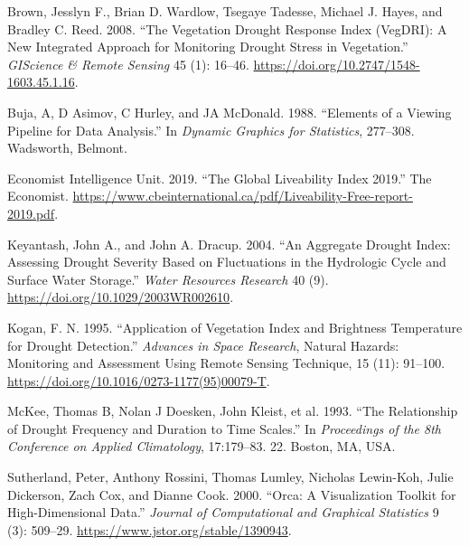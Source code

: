 \documentclass[
  letterpaper,
  DIV=11,
  numbers=noendperiod]{scrartcl}
\newlength{\cslhangindent}
\newlength{\cslentryspacingunit} %
\newenvironment{CSLReferences}[2] %
 {%
  \setlength{\parindent}{0pt}
  \ifodd #1
  \let\oldpar\par
  \def\par{\hangindent=\cslhangindent\oldpar}
  \fi
  \setlength{\parskip}{#2\cslentryspacingunit}
 }%
 {}
\begin{document}
\hypertarget{refs}{}
\begin{CSLReferences}{1}{0}
\leavevmode{}%
Brown, Jesslyn F., Brian D. Wardlow, Tsegaye Tadesse, Michael J. Hayes,
and Bradley C. Reed. 2008. {``The {Vegetation} {Drought} {Response}
{Index} ({VegDRI}): {A} {New} {Integrated} {Approach} for {Monitoring}
{Drought} {Stress} in {Vegetation}.''} \emph{GIScience \& Remote
Sensing} 45 (1): 16--46.
\url{https://doi.org/10.2747/1548-1603.45.1.16}.

\leavevmode{}%
Buja, A, D Asimov, C Hurley, and JA McDonald. 1988. {``Elements of a
Viewing Pipeline for Data Analysis.''} In \emph{Dynamic Graphics for
Statistics}, 277--308. Wadsworth, Belmont.

\leavevmode{}%
Economist Intelligence Unit. 2019. {``The Global Liveability Index
2019.''} The Economist.
\url{https://www.cbeinternational.ca/pdf/Liveability-Free-report-2019.pdf}.

\leavevmode{}%
Keyantash, John A., and John A. Dracup. 2004. {``An Aggregate Drought
Index: {Assessing} Drought Severity Based on Fluctuations in the
Hydrologic Cycle and Surface Water Storage.''} \emph{Water Resources
Research} 40 (9). \url{https://doi.org/10.1029/2003WR002610}.

\leavevmode{}%
Kogan, F. N. 1995. {``Application of Vegetation Index and Brightness
Temperature for Drought Detection.''} \emph{Advances in Space Research},
Natural {Hazards}: {Monitoring} and {Assessment} {Using} {Remote}
{Sensing} {Technique}, 15 (11): 91--100.
\url{https://doi.org/10.1016/0273-1177(95)00079-T}.

\leavevmode{}%
McKee, Thomas B, Nolan J Doesken, John Kleist, et al. 1993. {``The
Relationship of Drought Frequency and Duration to Time Scales.''} In
\emph{Proceedings of the 8th Conference on Applied Climatology},
17:179--83. 22. Boston, MA, USA.

\leavevmode{}%
Sutherland, Peter, Anthony Rossini, Thomas Lumley, Nicholas Lewin-Koh,
Julie Dickerson, Zach Cox, and Dianne Cook. 2000. {``Orca: {A}
{Visualization} {Toolkit} for {High}-{Dimensional} {Data}.''}
\emph{Journal of Computational and Graphical Statistics} 9 (3): 509--29.
\url{https://www.jstor.org/stable/1390943}.


\end{CSLReferences}
\end{document}
